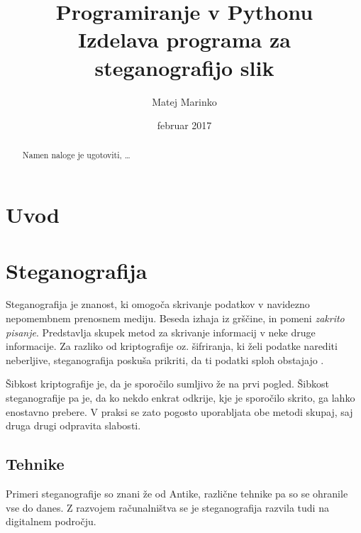 \documentclass[a4paper, 12pt]{article}
\begin{document}
\title{
    Programiranje v Pythonu\\\large
    Izdelava programa za steganografijo slik}
\author{Matej Marinko}
\date{februar 2017}

\maketitle
\thispagestyle{empty}
\newpage

\tableofcontents
\newpage

\begin{abstract}
    Namen naloge je ugotoviti, \ldots
\end{abstract}


\section{Uvod} 

\newpage 
\section{Steganografija}
    Steganografija je znanost, ki omogoča skrivanje podatkov v navidezno nepomembnem prenosnem mediju. Beseda izhaja iz grščine, in pomeni \textit{zakrito pisanje}. Predstavlja skupek metod za skrivanje informacij v neke druge informacije. Za razliko od kriptografije oz. šifriranja, ki želi podatke narediti neberljive, steganografija poskuša prikriti, da ti podatki sploh obstajajo \cite{monitor}.

    Šibkost kriptografije je, da je sporočilo sumljivo že na prvi pogled. Šibkost steganografije pa je, da ko nekdo enkrat odkrije, kje je sporočilo skrito, ga lahko enostavno prebere. V praksi se zato pogosto uporabljata obe metodi skupaj, saj druga drugi odpravita slabosti.

    \subsection{Tehnike}
        Primeri steganografije so znani že od Antike, različne tehnike pa so se ohranile vse do danes. Z razvojem računalništva se je steganografija razvila tudi na digitalnem področju.\\
\end{document}
